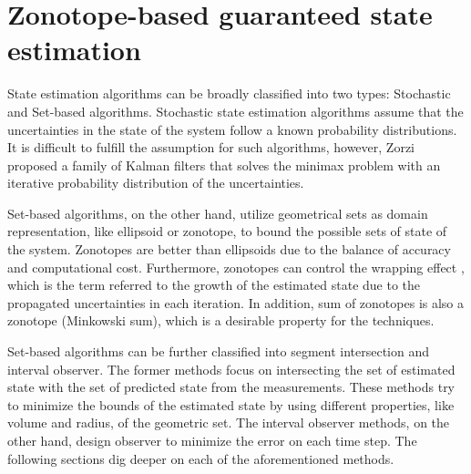 \chapter{Zonotope-based guaranteed state estimation} \label{ch:state_estimation}
State estimation algorithms can be broadly classified into two types: Stochastic and Set-based algorithms. Stochastic state estimation algorithms assume that the uncertainties in the state of the system follow a known probability distributions. It is difficult to fulfill the assumption for such algorithms, however, Zorzi \cite{Zorzi2017} proposed a family of Kalman filters that solves the minimax problem with an iterative probability distribution of the uncertainties.

Set-based algorithms, on the other hand, utilize geometrical sets as domain representation, like ellipsoid or zonotope, to bound the possible sets of state of the system. Zonotopes are better than ellipsoids due to the balance of accuracy and computational cost. Furthermore, zonotopes can control the wrapping effect \cite{Kuhn1998}, which is the term referred to the growth of the estimated state due to the propagated uncertainties in each iteration. In addition, sum of zonotopes is also a zonotope (Minkowski sum), which is a desirable property for the techniques.

Set-based algorithms can be further classified into segment intersection and interval observer. The former methods focus on intersecting the set of estimated state with the set of predicted state from the measurements. These methods try to minimize the bounds of the estimated state by using different properties, like volume and radius, of the geometric set. The interval observer methods, on the other hand, design observer to minimize the error on each time step. The following sections dig deeper on each of the aforementioned methods.

